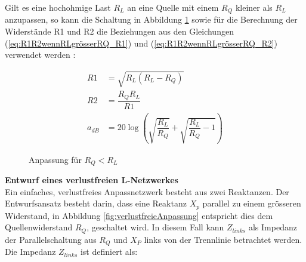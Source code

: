 Gilt es eine hochohmige Last $R_L$ an eine Quelle mit einem $R_Q$ kleiner als $R_L$ anzupassen, so kann die Schaltung in Abbildung \ref{fig:LeistungsanpassungU0_RQkleiner_als_RL} sowie für die Berechnung der Widerstände R1 und R2 die Beziehungen aus den Gleichungen (\ref{eq:R1R2wennRLgrösserRQ_R1}) und (\ref{eq:R1R2wennRLgrösserRQ_R2}) verwendet werden \cite{Tekom}:

\begin{align}
R1 &= \sqrt{R_L(R_L-R_Q)} \label{eq:R1R2wennRLgrösserRQ_R1}\\
R2 &= \dfrac{R_Q R_L}{R1} \label{eq:R1R2wennRLgrösserRQ_R2}\\
a_{dB} &= 20\log \left( \sqrt{\dfrac{R_L}{R_Q}}+\sqrt{\dfrac{R_L}{R_Q}-1}\right)
\end{align}
\begin{figure}[!ht]
	\begin{center}
	\end{center}
\caption{Anpassung für $R_Q < R_L$}
\label{fig:LeistungsanpassungU0_RQkleiner_als_RL}
\end{figure}
\newpage
\textbf{Entwurf eines verlustfreien L-Netzwerkes}\\
Ein einfaches, verlustfreies Anpassnetzwerk besteht aus zwei Reaktanzen. Der Entwurfsansatz besteht darin, dass eine Reaktanz $X_{p}$ parallel zu einem grösseren Widerstand, in Abbildung \ref{fig:verlustfreieAnpassung} entspricht dies dem Quellenwiderstand $R_{Q}$, geschaltet wird. In diesem Fall kann $Z_{links}$ als Impedanz der Parallelschaltung aus $R_Q$ und $X_P$ links von der Trennlinie betrachtet werden. Die Impedanz $Z_{links}$ ist definiert als:
